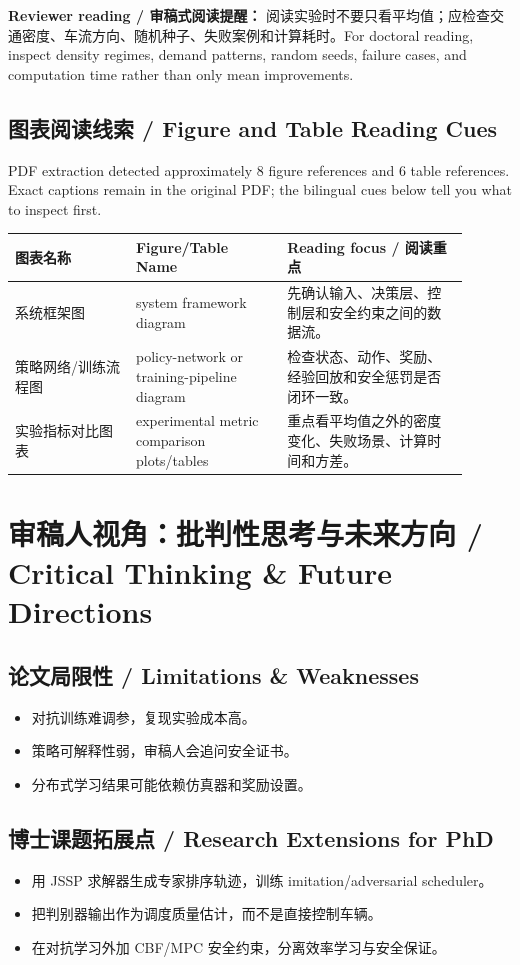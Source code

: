 \documentclass[UTF8,a4paper,11pt,fontset=fandol]{ctexart}
\begin{document}
\textbf{Reviewer reading / 审稿式阅读提醒：} 阅读实验时不要只看平均值；应检查交通密度、车流方向、随机种子、失败案例和计算耗时。For doctoral reading, inspect density regimes, demand patterns, random seeds, failure cases, and computation time rather than only mean improvements.

\subsection{图表阅读线索 / Figure and Table Reading Cues}
PDF extraction detected approximately 8 figure references and 6 table references. Exact captions remain in the original PDF; the bilingual cues below tell you what to inspect first.

\begin{longtable}{p{0.24\linewidth}p{0.30\linewidth}p{0.36\linewidth}}
\toprule
图表名称 & Figure/Table Name & Reading focus / 阅读重点\\
\midrule
系统框架图 & system framework diagram & 先确认输入、决策层、控制层和安全约束之间的数据流。 \\
策略网络/训练流程图 & policy-network or training-pipeline diagram & 检查状态、动作、奖励、经验回放和安全惩罚是否闭环一致。 \\
实验指标对比图表 & experimental metric comparison plots/tables & 重点看平均值之外的密度变化、失败场景、计算时间和方差。 \\
\bottomrule
\end{longtable}

\section{审稿人视角：批判性思考与未来方向 / Critical Thinking \& Future Directions}
\subsection{论文局限性 / Limitations \& Weaknesses}
\begin{itemize}
\item 对抗训练难调参，复现实验成本高。
\item 策略可解释性弱，审稿人会追问安全证书。
\item 分布式学习结果可能依赖仿真器和奖励设置。
\end{itemize}


\subsection{博士课题拓展点 / Research Extensions for PhD}
\begin{itemize}
\item 用 JSSP 求解器生成专家排序轨迹，训练 imitation/adversarial scheduler。
\item 把判别器输出作为调度质量估计，而不是直接控制车辆。
\item 在对抗学习外加 CBF/MPC 安全约束，分离效率学习与安全保证。
\end{itemize}
\end{document}
